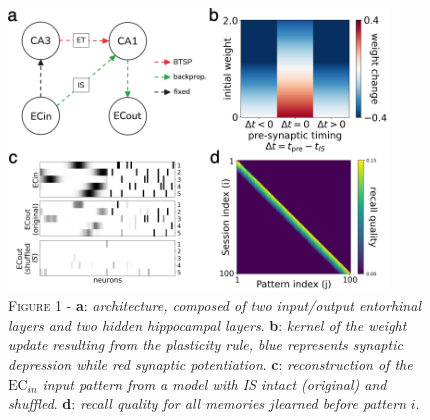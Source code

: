 \begin{figure}[h]
    \centering
    \includegraphics[width=0.9\textwidth]{figures/main_fig_a.png}
    \caption{\textsc{Figure 1} - \textbf{a}: \textit{architecture, composed of two input/output entorhinal layers and two hidden hippocampal layers}.
        \textbf{b}: \textit{kernel of the weight update resulting from the plasticity rule, blue represents synaptic depression while red synaptic
    potentiation}.
\textbf{c}: \textit{reconstruction of the} $\text{EC}_{in}$\textit{ input pattern from a model with IS intact (original) and shuffled}.
\textbf{d}: \textit{recall quality for all memories }$j$\textit{learned before pattern }$i$.}
    \label{fig:fig1}
\end{figure}




